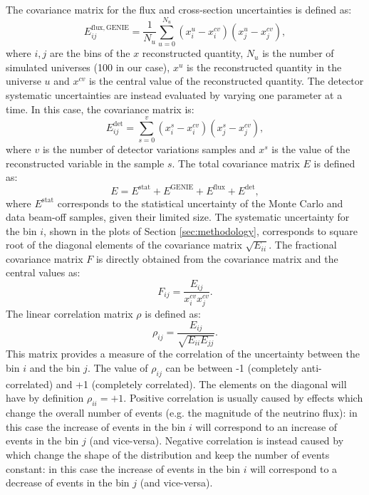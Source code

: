 The covariance matrix for the flux and cross-section uncertainties is defined as:
\begin{equation}
    E_{ij}^{\mathrm{flux, GENIE}} = \frac{1}{N_{u}} \sum^{N_{u}}_{u=0} (x^{u}_{i} - x^{cv}_{i}) (x^{u}_{j} - x^{cv}_{j}),\label{eq:covariance}
\end{equation}
where $i,j$ are the bins of the $x$ reconstructed quantity, $N_{u}$ is the number of simulated universes (100 in our case), $x^{u}$ is the reconstructed quantity in the universe $u$ and $x^{cv}$ is the central value of the reconstructed quantity. 
The detector systematic uncertainties are instead evaluated by varying one parameter at a time. In this case, the covariance matrix is:
\begin{equation}
    E_{ij}^{\mathrm{det}} = \sum^{v}_{s=0} (x^{s}_{i} - x^{cv}_{i}) (x^{s}_{j} - x^{cv}_{j}),\label{eq:cov_det}
\end{equation}
where $v$ is the number of detector variations samples and $x^{s}$ is the value of the reconstructed variable in the sample $s$. The total covariance matrix $E$ is defined as:
\begin{equation}
    E = E^{\mathrm{stat}} + E^{\mathrm{GENIE}} + E^{\mathrm{flux}} + E^{\mathrm{det}},\label{eq:cov_tot}
\end{equation}
where $E^{\mathrm{stat}}$ corresponds to the statistical uncertainty of the Monte Carlo and data beam-off samples, given their limited size. 
The systematic uncertainty for the bin $i$, shown in the plots of Section \ref{sec:methodology}, corresponds to square root of the diagonal elements of the covariance matrix $\sqrt{E_{ii}}$. The fractional covariance matrix $F$ is directly obtained from the covariance matrix and the central values as:
\begin{equation} 
    F_{ij} = \frac{E_{ij}}{x_{i}^{cv} x_{j}^{cv}}.
\end{equation}
The linear correlation matrix $\rho$ is defined as:
\begin{equation}
    \rho_{ij} = \frac{E_{ij}}{\sqrt{E_{ii}E_{jj}}}.
\end{equation}
This matrix provides a measure of the correlation of the uncertainty between the bin $i$ and the bin $j$. The value of $\rho_{ij}$ can be between -1 (completely anti-correlated) and +1 (completely correlated). The elements on the diagonal will have by definition $\rho_{ii}=+1$. 
Positive correlation is usually caused by effects which change the overall number of events (e.g. the magnitude of the neutrino flux): in this case the increase of events in the bin $i$ will correspond to an increase of events in the bin $j$ (and vice-versa). Negative correlation is instead caused by which change the shape of the distribution and keep the number of events constant: in this case the increase of events in the bin $i$ will correspond to a decrease of events in the bin $j$ (and vice-versa).

